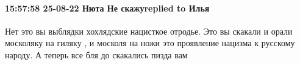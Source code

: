  
 
 
 
 

\paragraph{15:57:58 25-08-22 Нюта Не скажуreplied to Илья}

Нет это вы выблядки хохлядские нацисткое отродье. Это вы скакали и орали
москоляку на гиляку , и москоля на ножи это проявление нацизма к русскому
народу. А теперь все бля до скакались пизда вам
